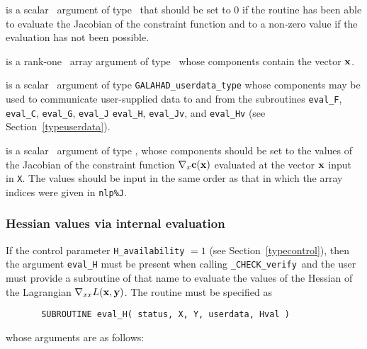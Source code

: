 \documentclass{galahad}
\newcommand{\packagename}{CHECK}
\newcommand{\fullpackagename}{\libraryname\_\packagename}
\newcommand{\solver}{{\tt \fullpackagename\_verify}}
\begin{document}
\begin{description}
 is a scalar \intentout\ argument of type \integer\
that should be set to 0 if the routine has been able to evaluate
the Jacobian of the constraint function
and to a non-zero value if the evaluation has not been possible.

 is a rank-one \intentin\ array argument of type \realdp\
whose components contain the vector ${\mathbf{x}}$.

 is a scalar \intentinout\ argument of type 
{\tt GALAHAD\_userdata\_type} whose components may be used
to communicate user-supplied data to and from the
subroutines {\tt eval\_F}, {\tt eval\_C}, {\tt eval\_G}, {\tt eval\_J}
{\tt eval\_H}, {\tt eval\_Jv}, and {\tt eval\_Hv} 
(see Section~\ref{typeuserdata}).

 is a scalar \intentout\ argument of type \realdp,
whose components should be set to the values of the Jacobian
of the constraint function $\nabla_x {\mathbf{c}}({\mathbf{x}})$
evaluated at the vector ${\mathbf{x}}$ input in {\tt X}. The values should
be input in the same order as that in which the array indices were
given in {\tt nlp\%J}.

\end{description}


\subsubsection{Hessian values via internal evaluation\label{hfv}}

If the control parameter {\tt H\_availability} $=1$ (see
Section~\ref{typecontrol}), then the argument {\tt eval\_H} must be
present when calling \solver\ and the
user must provide a subroutine of that name to evaluate the
values of the Hessian of the Lagrangian $\nabla_{xx} L({\mathbf{x}},{\mathbf{y}})$.
The routine must be specified as

\def\baselinestretch{0.8}
{\tt \begin{verbatim}
       SUBROUTINE eval_H( status, X, Y, userdata, Hval ) \end{verbatim} }
\def\baselinestretch{1.0}
\noindent whose arguments are as follows:
\end{document}
